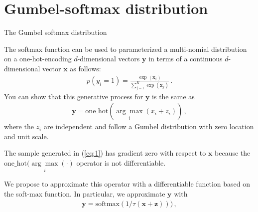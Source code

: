
\section{Gumbel-softmax distribution}

The Gumbel softmax distribution 

The softmax function can be used to parameterized a multi-nomial distribution
on a one-hot-encoding $d$-dimensional vectors $\mathbf{y}$ in terms of a
continuous $d$-dimensional vector $\mathbf{x}$ as follows:
\begin{align}
p(y_i=1) = \frac{\exp(\mathbf{x}_i)}{\sum_{j=1}^K\exp(\mathbf{x}_j)}\,.
\end{align}
You can show that this generative process for $\mathbf{y}$ is the same as
\begin{align}
\mathbf{y} = \text{one\_hot}(\underset{i}{\arg\max} (x_i + z_i))\,,\label{eq:1}
\end{align}
where the $z_i$ are independent and follow a Gumbel distribution with zero
location and unit scale.

The sample generated in (\ref{eq:1}) has gradient zero with respect to
$\mathbf{x}$ because the $\text{one\_hot}(\underset{i}{\arg\max}(\cdot)$
operator is not differentiable.

We propose to approximate this operator with a differentiable function based on the soft-max function.
In particular, we approximate $\mathbf{y}$ with 
\begin{align}
\mathbf{y} = \text{softmax}(1 / \tau (\mathbf{x} + \mathbf{z})))\,,\label{eq:2}
\end{align}




